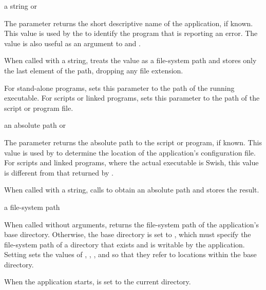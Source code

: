 \begin{parameter}
\end{parameter}
\hasvalue{} a string or 

The  parameter returns the short descriptive name of the
application, if known.
This value is used by the  to identify the program
that is reporting an error.
The value is also useful as an argument to  and
.

When called with a string,  treats the value as
a file-system path and stores only the last element of the path,
dropping any file extension.

For stand-alone programs, 
sets this parameter to the path of the running executable.
For scripts or linked programs, 
sets this parameter to the path of the script or program file.

\begin{parameter}
\end{parameter}
\hasvalue{} an absolute path or 

The  parameter returns the absolute path to the script or
program, if known.
This value is used by  to determine the
location of the application's configuration file.
For scripts and linked programs, where the actual executable is Swish, this
value is different from that returned by .

When called with a string,  calls  to
obtain an absolute path and stores the result.

\begin{parameter}
\end{parameter}
\hasvalue{} a file-system path

When called without arguments,  returns the file-system path of
the application's base directory.
Otherwise, the base directory is set to , which must specify the
file-system path of a directory that exists and is writable by the application.
Setting  sets the values of , ,
, and  so that they refer to locations within the
base directory.

When the application starts,  is set to the current directory.

